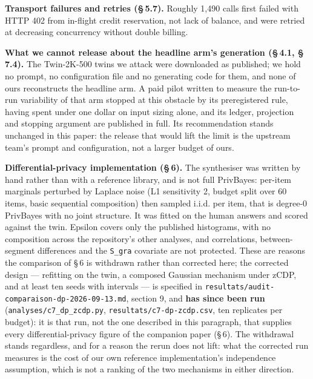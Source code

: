 \documentclass[sigconf,anonymous,review]{acmart}
\begin{document}
\begin{openscience}
\begin{sloppypar}
\textbf{Transport failures and retries (\S\,5.7).} Roughly 1,490 calls first failed with HTTP 402 from in-flight credit reservation, not lack of balance, and were retried at decreasing concurrency without double billing.

\textbf{What we cannot release about the headline arm's generation (\S\,4.1, \S\,7.4).} The Twin-2K-500 twins we attack were downloaded as published; we hold no prompt, no configuration file and no generating code for them, and none of ours reconstructs the headline arm. A paid pilot written to measure the run-to-run variability of that arm stopped at this obstacle by its preregistered rule, having spent under one dollar on input sizing alone, and its ledger, projection and stopping argument are published in full. Its recommendation stands unchanged in this paper: the release that would lift the limit is the upstream team's prompt and configuration, not a larger budget of ours.

\textbf{Differential-privacy implementation (\S\,6).} The synthesiser was written by hand rather than with a reference library, and is not full PrivBayes: per-item marginals perturbed by Laplace noise (L1 sensitivity 2, budget split over 60 items, basic sequential composition) then sampled i.i.d. per item, that is degree-0 PrivBayes with no joint structure. It was fitted on the human answers and scored against the twin. Epsilon covers only the published histograms, with no composition across the repository's other analyses, and correlations, between-segment differences and the \texttt{S\_\allowbreak{}gra} covariate are not protected. These are reasons the comparison of \S\,6 is withdrawn rather than corrected here; the corrected design --- refitting on the twin, a composed Gaussian mechanism under zCDP, and at least ten seeds with intervals --- is specified in \texttt{resultats/\allowbreak{}audit-\allowbreak{}comparaison-\allowbreak{}dp-\allowbreak{}2026-\allowbreak{}09-\allowbreak{}13\allowbreak{}.md}, section 9, and \textbf{has since been run} (\texttt{analyses/\allowbreak{}c7\_\allowbreak{}dp\_\allowbreak{}zcdp\allowbreak{}.py}, \texttt{resultats/\allowbreak{}c7-\allowbreak{}dp-\allowbreak{}zcdp\allowbreak{}.csv}, ten replicates per budget): it is that run, not the one described in this paragraph, that supplies every differential-privacy figure of the companion paper (\S\,6). The withdrawal stands regardless, and for a reason the rerun does not lift: what the corrected run measures is the cost of our own reference implementation's independence assumption, which is not a ranking of the two mechanisms in either direction.


\end{sloppypar}
\end{openscience}
\end{document}
